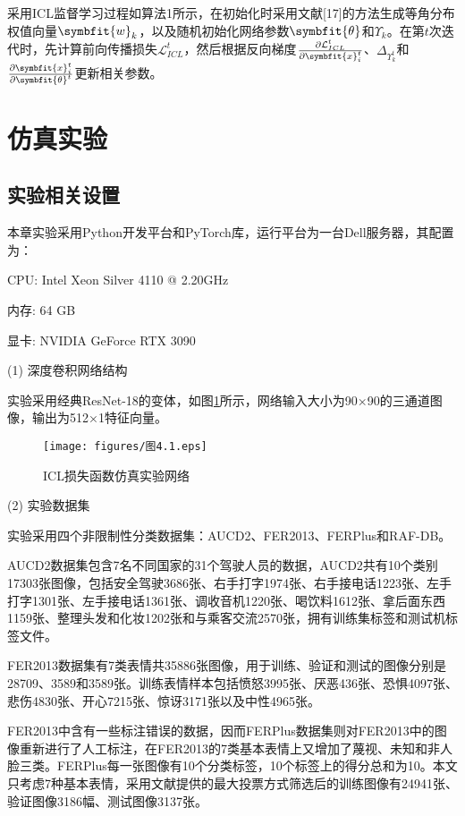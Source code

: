 采用ICL监督学习过程如算法1所示，在初始化时采用文献[17]的方法生成等角分布权值向量$\symbfit{w}_k$，以及随机初始化网络参数$\symbfit{\theta}$和$\Upsilon_k$。在第$t$次迭代时，先计算前向传播损失$\mathcal{L}_{ICL}^t$，然后根据反向梯度$\frac{\partial\mathcal{L}_{ICL}^t}{\partial\symbfit{x}_i^t}$、$\Delta_{{\Upsilon}_{k}^{t}}$和$\frac{\partial\symbfit{x}_i^t}{\partial\symbfit{\theta}^t}$更新相关参数。

\section{仿真实验}

\subsection{实验相关设置}

本章实验采用Python开发平台和PyTorch库，运行平台为一台Dell服务器，其配置为：

CPU: Intel Xeon Silver 4110 @ 2.20GHz

内存: 64 GB

显卡: NVIDIA GeForce RTX 3090 

(1)	深度卷积网络结构

实验采用经典ResNet-18的变体，如图\ref{图4.1}所示，网络输入大小为90×90的三通道图像，输出为512×1特征向量。

\begin{figure}[!ht]
	\centering
	\texttt{[image: figures/图4.1.eps]}
	\caption{ICL损失函数仿真实验网络}\label{图4.1}
\end{figure}

(2)	实验数据集

实验采用四个非限制性分类数据集：AUCD2、FER2013、FERPlus和RAF-DB。

AUCD2数据集包含7名不同国家的31个驾驶人员的数据，AUCD2共有10个类别17303张图像，包括安全驾驶3686张、右手打字1974张、右手接电话1223张、左手打字1301张、左手接电话1361张、调收音机1220张、喝饮料1612张、拿后面东西1159张、整理头发和化妆1202张和与乘客交流2570张，拥有训练集标签和测试机标签文件。

FER2013数据集有7类表情共35886张图像，用于训练、验证和测试的图像分别是28709、3589和3589张。训练表情样本包括愤怒3995张、厌恶436张、恐惧4097张、悲伤4830张、开心7215张、惊讶3171张以及中性4965张。

FER2013中含有一些标注错误的数据，因而FERPlus数据集则对FER2013中的图像重新进行了人工标注，在FER2013的7类基本表情上又增加了蔑视、未知和非人脸三类。FERPlus每一张图像有10个分类标签，10个标签上的得分总和为10。本文只考虑7种基本表情，采用文献\cite{67}提供的最大投票方式筛选后的训练图像有24941张、验证图像3186幅、测试图像3137张。


